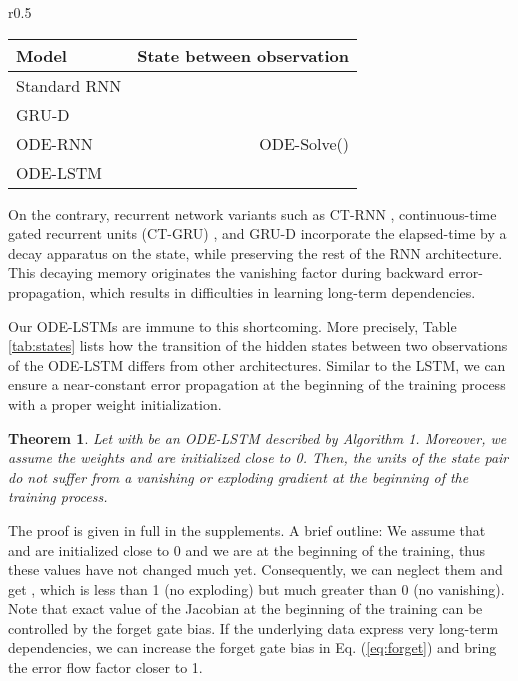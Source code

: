 \documentclass{article}
\newtheorem{theorem}{Theorem}
\begin{document}
\begin{wraptable}[9]{r}{0.5\textwidth}
    \vspace{-4mm}
    \centering
    \caption{Change to the hidden states of an RNN between two observations  and }
    \vspace{-2mm}
    \begin{tabular}{lr}
        \toprule
        \textbf{Model} & State between observation \\
        \midrule
        Standard RNN &  \\
        GRU-D &   \\
        ODE-RNN & ODE-Solve()  \\
        ODE-LSTM &  \\
        \bottomrule
    \end{tabular}
    \vspace{1mm}
    \label{tab:states}
\end{wraptable}
On the contrary, recurrent network variants such as CT-RNN \cite{funahashi1993approximation}, continuous-time gated recurrent units (CT-GRU) \cite{mozer2017discrete}, and GRU-D \cite{che2018recurrent} incorporate the elapsed-time by a decay apparatus on the state, while preserving the rest of the RNN architecture. This decaying memory originates the vanishing factor during backward error-propagation, which results in difficulties in learning long-term dependencies. 

Our ODE-LSTMs are immune to this shortcoming.
More precisely, Table \ref{tab:states} lists how the transition of the hidden states between two observations of the ODE-LSTM differs from other architectures. 
Similar to the LSTM, we can ensure a near-constant error propagation at the beginning of the training process with a proper weight initialization.
\begin{theorem}
\label{thm:ode_lstm}
    Let  with  be an ODE-LSTM described by Algorithm 1. Moreover, we assume the weights   and  are initialized close to 0.
    Then, the units  of the state pair  do not suffer from a vanishing or exploding gradient at the beginning of the training process.
    \vspace{-2.5mm}
\end{theorem}
The proof is given in full in the supplements. A brief outline: We assume that  and  are initialized close to 0 and we are at the beginning of the training, thus these values have not changed much yet. Consequently, we can neglect them and get ,  which is less than 1 (no exploding) but much greater than 0 (no vanishing). Note that exact value of the Jacobian at the beginning of the training can be controlled by the forget gate bias. If the underlying data express very long-term dependencies, we can increase the forget gate bias in Eq. (\ref{eq:forget}) and bring the error flow factor closer to 1. 
\end{document}
